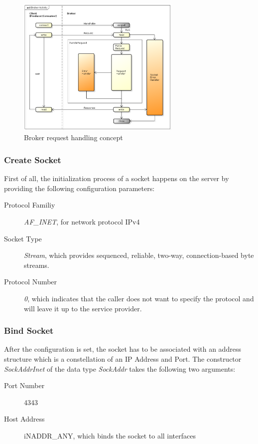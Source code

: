 \begin{figure}[H]
    \centering
    \includegraphics[width=0.7\textwidth]{images/broker-activity.png}
    \caption{Broker request handling concept}
    \label{fig:broker-activity}
\end{figure}

\subsubsection{Create Socket}

First of all, the initialization process of a socket happens on the server by providing the following configuration parameters:
\begin{description}
  \item[Protocol Familiy] \textit{AF\_INET}, for network protocol IPv4
  \item[Socket Type] \textit{Stream}, which provides sequenced, reliable, two-way, connection-based byte streams.
  \item[Protocol Number] \textit{0}, which indicates that the caller does not want to specify the protocol and will leave it up to the service provider.
\end{description}

\subsubsection{Bind Socket}

After the configuration is set, the socket has to be associated with an address
structure which is a constellation of an IP Address and Port. The constructor
\textit{SockAddrInet} of the data type \textit{SockAddr} takes the following
two arguments:

\begin{description}
  \item[Port Number] 4343
  \item[Host Address] iNADDR\_ANY, which binds the socket to all interfaces
\end{description}

